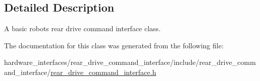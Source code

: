\subsection{Detailed Description}
A basic robot\textquotesingle{}s rear drive command interface class. 

The documentation for this class was generated from the following file\+:\begin{DoxyCompactItemize}
\item 
hardware\+\_\+interfaces/rear\+\_\+drive\+\_\+command\+\_\+interface/include/rear\+\_\+drive\+\_\+command\+\_\+interface/\hyperlink{rear__drive__command__interface_8h}{rear\+\_\+drive\+\_\+command\+\_\+interface.\+h}\end{DoxyCompactItemize}
